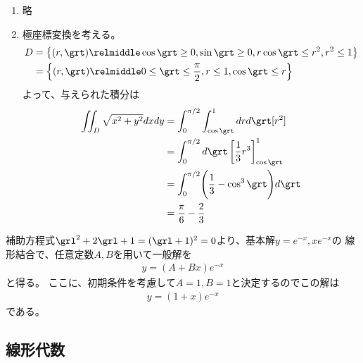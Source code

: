 \begin{ans*}
  ${}$
  \begin{enumerate}[label=(\arabic*)]
    \item 略
    \item 極座標変換を考える。
    \begin{align}
      D 
      &= \left\{(r,\grt)\relmiddle \cos\grt\geq 0, \sin\grt\geq 0, r\cos\grt\leq r^2, r^2\leq 1\right\} \\
      &= \left\{(r,\grt)\relmiddle 0\leq \grt\leq \frac{\pi}{2}, r\leq 1, \cos\grt \leq r\right\}
    \end{align}
    よって、与えられた積分は
    \begin{align}
      \iint_D \sqrt{x^2+y^2}dxdy
      &= \int_{0}^{\pi/2}\int_{\cos\grt}^{1} drd\grt [r^2] \\
      &= \int_{0}^{\pi/2}d\grt \left[ \frac{1}{3}r^3 \right]_{\cos\grt}^{1} \\
      &= \int_{0}^{\pi/2} \Biggl( \frac{1}{3} - \cos^3\grt \Biggr) d\grt \\
      &= \frac{\pi}{6} - \frac{2}{3}
    \end{align}
  \end{enumerate}
\end{ans*}


\begin{ans*}
  補助方程式$\grl^2+2\grl+1 = (\grl + 1)^2 = 0$より、基本解$y = e^{-x},xe^{-x}$の
  線形結合で、任意定数$A,B$を用いて一般解を
  \begin{gather}
    y = (A+Bx)e^{-x}
  \end{gather}
  と得る。
  ここに、初期条件を考慮して$A = 1,B = 1$と決定するのでこの解は
  \begin{gather}
    y = (1+x)e^{-x}
  \end{gather}
  である。
\end{ans*}


\subsection{線形代数}


